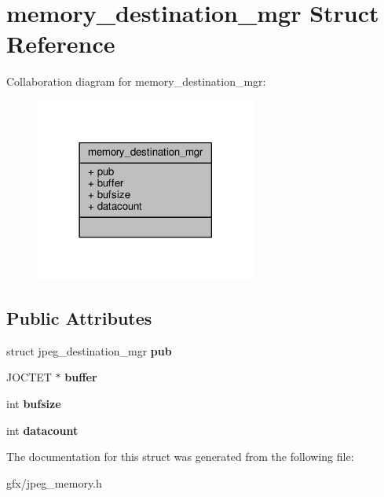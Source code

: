 \hypertarget{structmemory__destination__mgr}{}\section{memory\+\_\+destination\+\_\+mgr Struct Reference}
\label{structmemory__destination__mgr}


Collaboration diagram for memory\+\_\+destination\+\_\+mgr\+:
\nopagebreak
\begin{figure}[H]
\begin{center}
\leavevmode
\includegraphics[width=206pt]{d1/d36/structmemory__destination__mgr__coll__graph}
\end{center}
\end{figure}
\subsection*{Public Attributes}
\begin{DoxyCompactItemize}
\item 
struct jpeg\+\_\+destination\+\_\+mgr {\bfseries pub}\hypertarget{structmemory__destination__mgr_af8c2560ac94ef09532ff72404675d5d9}{}\label{structmemory__destination__mgr_af8c2560ac94ef09532ff72404675d5d9}

\item 
J\+O\+C\+T\+ET $\ast$ {\bfseries buffer}\hypertarget{structmemory__destination__mgr_a43da4fbb66aef931f8994e1e1173a314}{}\label{structmemory__destination__mgr_a43da4fbb66aef931f8994e1e1173a314}

\item 
int {\bfseries bufsize}\hypertarget{structmemory__destination__mgr_a613e5a9e69ca6a498e687d33799e97e2}{}\label{structmemory__destination__mgr_a613e5a9e69ca6a498e687d33799e97e2}

\item 
int {\bfseries datacount}\hypertarget{structmemory__destination__mgr_add951d03e7911d49dbe092f25f7fcf3f}{}\label{structmemory__destination__mgr_add951d03e7911d49dbe092f25f7fcf3f}

\end{DoxyCompactItemize}


The documentation for this struct was generated from the following file\+:\begin{DoxyCompactItemize}
\item 
gfx/jpeg\+\_\+memory.\+h\end{DoxyCompactItemize}
